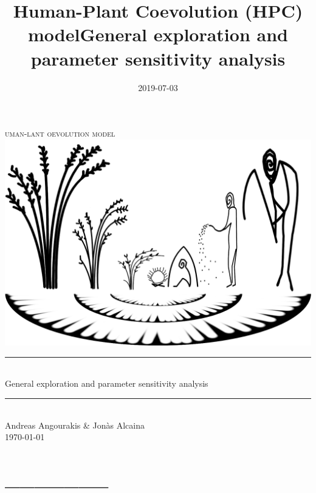 \documentclass[]{book}
\title{Human-Plant Coevolution (HPC) modelGeneral exploration and parameter sensitivity analysis}
\author{}
\date{2019-07-03}
\begin{document}
\maketitle

\newcommand{\HRule}{\rule{\linewidth}{0.5mm}}


\begin{center}

\textsc{\LARGE
{}uman-lant oevolution model} 
\\[1cm]
\includegraphics[width=\textwidth]{images/hpcModel-logo_v2.png}
\\[1.5cm]
\HRule \\[0.4cm]
{ \huge General exploration and parameter sensitivity analysis \\[0.15cm] }
\HRule \\[1.5cm]
Andreas Angourakis \& Jon\`{a}s Alcaina
\\[1cm]
\today \\ [1cm]

\end{center}

\newpage
{}

{
\hypersetup{linkcolor=black}
\setcounter{tocdepth}{1}
\tableofcontents
}
\hypertarget{section}{%
\chapter*{\_\_\_\_\_\_\_}\label{section}}
\end{document}
